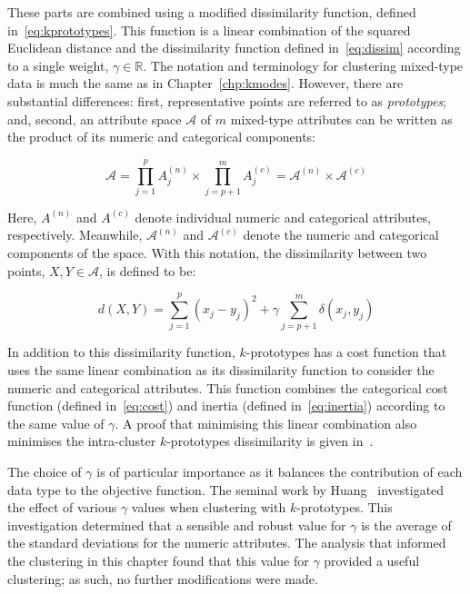 These parts are combined using a modified dissimilarity function, defined
in~\eqref{eq:kprototypes}. This function is a linear combination of the squared
Euclidean distance and the dissimilarity function defined in~\eqref{eq:dissim}
according to a single weight, \(\gamma \in \mathbb R\). The notation and
terminology for clustering mixed-type data is much the same as in
Chapter~\ref{chp:kmodes}. However, there are substantial differences: first,
representative points are referred to as \emph{prototypes}; and, second, an
attribute space \(\mathcal A\) of \(m\) mixed-type attributes can be written as
the product of its numeric and categorical components:

\begin{equation}
    \mathcal A
    = \prod_{j=1}^{p} A^{(n)}_j \times \prod_{j=p+1}^{m} A^{(c)}_j
    = \mathcal A^{(n)} \times \mathcal A^{(c)}
\end{equation}

Here, \(A^{(n)}\) and \(A^{(c)}\) denote individual numeric and categorical
attributes, respectively. Meanwhile, \(\mathcal A^{(n)}\) and \(\mathcal
A^{(c)}\) denote the numeric and categorical components of the space. With this
notation, the dissimilarity between two points, \(X, Y \in \mathcal A\), is
defined to be:

\begin{equation}\label{eq:kprototypes}
    d(X, Y) = \sum_{j=1}^{p} \left(x_j - y_j\right)^2 + \gamma \sum_{j=p+1}^{m}
    \delta \left(x_j, y_j\right)
\end{equation}



In addition to this dissimilarity function, \(k\)-prototypes has a cost function
that uses the same linear combination as its dissimilarity function to consider
the numeric and categorical attributes. This function combines the categorical
cost function (defined in~\eqref{eq:cost}) and inertia (defined
in~\eqref{eq:inertia}) according to the same value of \(\gamma\). A proof that
minimising this linear combination also minimises the intra-cluster
\(k\)-prototypes dissimilarity is given in~\cite{Huang1997a}.

The choice of \(\gamma\) is of particular importance as it balances the
contribution of each data type to the objective function. The seminal work by
Huang~\cite{Huang1997a} investigated the effect of various \(\gamma\) values
when clustering with \(k\)-prototypes. This investigation determined that a
sensible and robust value for \(\gamma\) is the average of the standard
deviations for the numeric attributes. The analysis that informed the clustering
in this chapter found that this value for \(\gamma\) provided a useful
clustering; as such, no further modifications were made.

